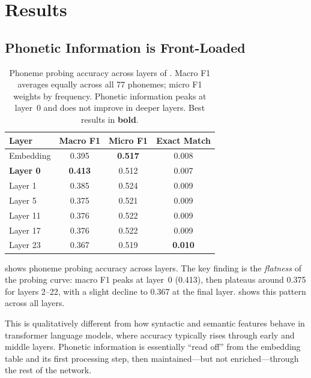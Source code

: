 \section{Results}
\label{sec:results}

\subsection{Phonetic Information is Front-Loaded}
\label{sec:probing}

\begin{table}[t]
    \centering
    \caption{Phoneme probing accuracy across layers of \gptmed. Macro F1 averages equally across all 77 phonemes; micro F1 weights by frequency. Phonetic information peaks at layer~0 and does not improve in deeper layers. Best results in \textbf{bold}.}
    \begin{tabular}{@{}lccc@{}}
        \toprule
        \textbf{Layer} & \textbf{Macro F1} & \textbf{Micro F1} & \textbf{Exact Match} \\
        \midrule
        Embedding     & 0.395 & \textbf{0.517} & 0.008 \\
        \textbf{Layer 0}  & \textbf{0.413} & 0.512 & 0.007 \\
        Layer 1       & 0.385 & 0.524 & 0.009 \\
        Layer 5       & 0.375 & 0.521 & 0.009 \\
        Layer 11      & 0.376 & 0.522 & 0.009 \\
        Layer 17      & 0.376 & 0.522 & 0.009 \\
        Layer 23      & 0.367 & 0.519 & \textbf{0.010} \\
        \bottomrule
    \end{tabular}
    \label{tab:layer_probing}
\end{table}

 shows phoneme probing accuracy across layers.
The key finding is the \emph{flatness} of the probing curve: macro F1 peaks at layer~0 (0.413), then plateaus around 0.375 for layers 2--22, with a slight decline to 0.367 at the final layer.
 shows this pattern across all layers.

This is qualitatively different from how syntactic and semantic features behave in transformer language models, where accuracy typically rises through early and middle layers.
Phonetic information is essentially ``read off'' from the embedding table and its first processing step, then maintained---but not enriched---through the rest of the network.

